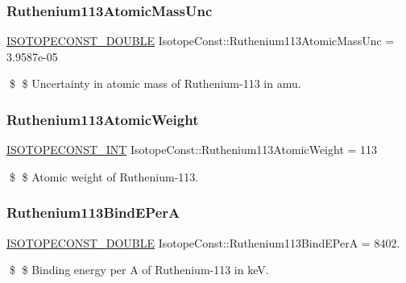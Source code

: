 \subsubsection{\texorpdfstring{Ruthenium113\+Atomic\+Mass\+Unc}{Ruthenium113AtomicMassUnc}}
{\footnotesize\ttfamily \mbox{\hyperlink{group___isotope_const-_macros_ga8f45a7272ce02c0b4c65c44636ed719a}{I\+S\+O\+T\+O\+P\+E\+C\+O\+N\+S\+T\+\_\+\+D\+O\+U\+B\+LE}} Isotope\+Const\+::\+Ruthenium113\+Atomic\+Mass\+Unc = 3.\+9587e-\/05}

\$ \$ Uncertainty in atomic mass of Ruthenium-\/113 in amu. \mbox{\label{group___isotope_const-_ruthenium-_ru113_gaeada975633aa640a6a4846e885d1bb85}} 
\subsubsection{\texorpdfstring{Ruthenium113\+Atomic\+Weight}{Ruthenium113AtomicWeight}}
{\footnotesize\ttfamily \mbox{\hyperlink{group___isotope_const-_macros_ga5f18360b3e99483a35c32d789e62621c}{I\+S\+O\+T\+O\+P\+E\+C\+O\+N\+S\+T\+\_\+\+I\+NT}} Isotope\+Const\+::\+Ruthenium113\+Atomic\+Weight = 113}

\$ \$ Atomic weight of Ruthenium-\/113. \mbox{\label{group___isotope_const-_ruthenium-_ru113_gaa74c7d6d63c6d2a0a04fe708b6ac28bd}} 
\subsubsection{\texorpdfstring{Ruthenium113\+Bind\+E\+PerA}{Ruthenium113BindEPerA}}
{\footnotesize\ttfamily \mbox{\hyperlink{group___isotope_const-_macros_ga8f45a7272ce02c0b4c65c44636ed719a}{I\+S\+O\+T\+O\+P\+E\+C\+O\+N\+S\+T\+\_\+\+D\+O\+U\+B\+LE}} Isotope\+Const\+::\+Ruthenium113\+Bind\+E\+PerA = 8402.}

\$ \$ Binding energy per A of Ruthenium-\/113 in keV. \mbox{\label{group___isotope_const-_ruthenium-_ru113_gae5772163024a7651513f98ae00897e2d}} 
